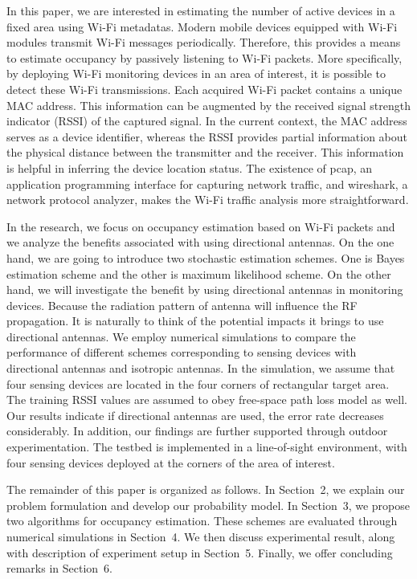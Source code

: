 In this paper, we are interested in estimating the number of active devices in a fixed area using Wi-Fi metadatas.
Modern mobile devices equipped with Wi-Fi modules transmit Wi-Fi messages periodically.
Therefore, this provides a means to estimate occupancy by passively listening to Wi-Fi packets.
More specifically, by deploying Wi-Fi monitoring devices in an area of interest, it is possible to detect these Wi-Fi transmissions.
Each acquired Wi-Fi packet contains a unique MAC address.
This information can be augmented by the received signal strength indicator (RSSI) of the captured signal.
In the current context, the MAC address serves as a device identifier, whereas the RSSI provides partial information about the physical distance between the transmitter and the receiver. This information is helpful in inferring the device location status.
The existence of pcap, an application programming interface for capturing network traffic, and wireshark, a network protocol analyzer, makes the Wi-Fi traffic analysis more straightforward. 

In the research, we focus on occupancy estimation based on Wi-Fi packets and we analyze the benefits associated with using directional antennas.
On the one hand, we are going to introduce two stochastic estimation schemes.
One is Bayes estimation scheme and the other is maximum likelihood scheme.
On the other hand, we will investigate the benefit by using directional antennas in monitoring devices.  Because the radiation pattern of antenna will influence the RF propagation. It is naturally to think of the potential impacts it brings to use directional antennas. 
We employ numerical simulations to compare the performance of different schemes corresponding to sensing devices with directional antennas and isotropic antennas.
In the simulation, we assume that four sensing devices are located in the four corners of rectangular target area. The training RSSI values are assumed to obey free-space path loss model as well. Our results indicate if directional antennas are used, the error rate decreases considerably.
In addition, our findings are further supported through outdoor experimentation.
The testbed is implemented in a line-of-sight environment, with four sensing devices deployed at the corners of the area of interest.

The remainder of this paper is organized as follows.
In Section~2, we explain our problem formulation and develop our probability model.
In Section~3, we propose two algorithms for occupancy estimation.
These schemes are evaluated through numerical simulations in Section~4.
We then discuss experimental result, along with description of experiment setup in Section~5.
Finally, we offer concluding remarks in Section~6.

 






 


